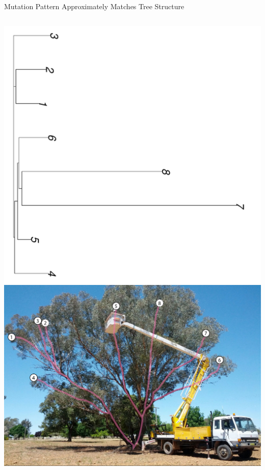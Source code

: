 \documentclass{beamer}
\begin{document}
\begin{frame}{Mutation Pattern Approximately Matches Tree Structure}
\begin{columns}
	\includegraphics[width=\linewidth,angle=90]{figures/gatk_tree_rotated.pdf}
	\includegraphics[width=\linewidth]{figures/labeled_tree.jpg}
\end{columns}
\end{frame}
\end{document}
